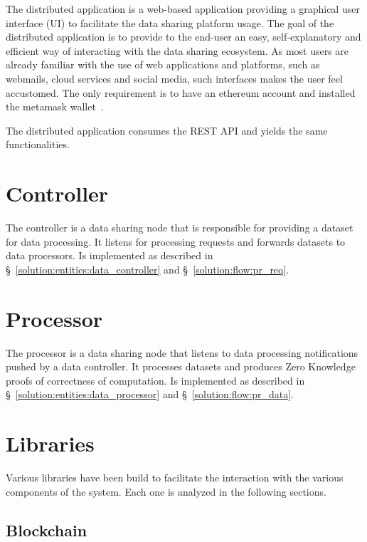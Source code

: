The distributed application is a web-based application providing a graphical user interface (UI) to facilitate the data sharing platform usage. The goal of the distributed application is to provide to the end-user an easy, self-explanatory and efficient way of interacting with the data sharing ecosystem. As most users are already familiar with the use of web applications and platforms, such as webmails, cloud services and social media, such interfaces makes the user feel accustomed. The only requirement is to have an ethereum account and installed the metamask wallet~\cite{metamask}.

The distributed application consumes the REST API and yields the same functionalities.

\section{Controller}
\label{implemenation:controller}

The controller is a data sharing node that is responsible for providing a dataset for data processing. It listens for processing requests and forwards datasets to data processors. Is implemented as described in §~\ref{solution:entities:data_controller} and §~\ref{solution:flow:pr_req}.

\section{Processor}
\label{implemenation:processor}

The processor is a data sharing node that listens to data processing notifications pushed by a data controller. It processes datasets and produces Zero Knowledge proofs of correctness of computation. Is implemented as described in §~\ref{solution:entities:data_processor} and §~\ref{solution:flow:pr_data}.

\section{Libraries}
\label{implemenation:libs}

Various libraries have been build to facilitate the interaction with the various components of the system. Each one is analyzed in the following sections.

\subsection{Blockchain}
\label{implemenation:libs:bl}


